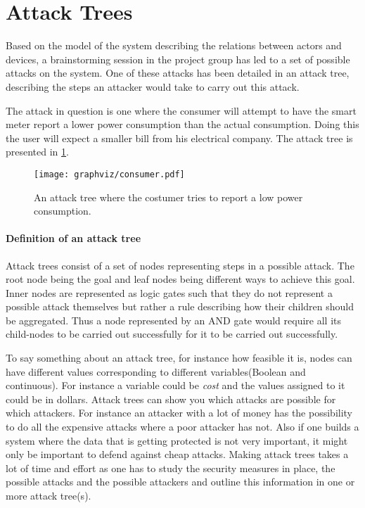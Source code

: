\section{Attack Trees}
Based on the model of the system describing the relations between actors and devices, a brainstorming session in the project group has led to a set of possible attacks on the system.
One of these attacks has been detailed in an attack tree, describing the steps an attacker would take to carry out this attack.

The attack in question is one where the consumer will attempt to have the smart meter report a lower power consumption than the actual consumption.
Doing this the user will expect a smaller bill from his electrical company.
The attack tree is presented in \cref{report_power_attack_tree}.

\begin{figure}
  \texttt{[image: graphviz/consumer.pdf]}
  \caption{An attack tree where the costumer tries to report a low power consumption.}
  \label{report_power_attack_tree}
\end{figure}

\paragraph{Definition of an attack tree}
Attack trees consist of a set of nodes representing steps in a possible attack.
The root node being the goal and leaf nodes being different ways to achieve this goal.
Inner nodes are represented as logic gates such that they do not represent a possible attack themselves but rather a rule describing how their children should be aggregated.
Thus a node represented by an AND gate would require all its child-nodes to be carried out successfully for it to be carried out successfully.

To say something about an attack tree, for instance how feasible it is, nodes can have different values corresponding to different variables(Boolean and continuous).
For instance a variable could be \textit{cost} and the values assigned to it could be in dollars.
Attack trees can show you which attacks are possible for which attackers.
For instance an attacker with a lot of money has the possibility to do all the expensive attacks where a poor attacker has not.
Also if one builds a system where the data that is getting protected is not very important, it might only be important to defend against cheap attacks.
Making attack trees takes a lot of time and effort as one has to study the security measures in place, the possible attacks and the possible attackers and outline this information in one or more attack tree(s).\cite{schneier_attack_trees}

